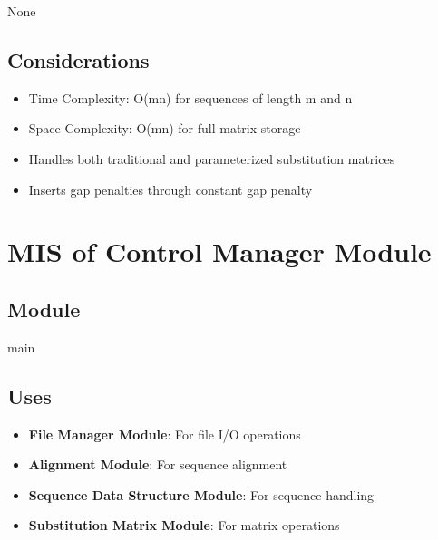 \documentclass[12pt, titlepage]{article}
\begin{document}
None

\subsection{Considerations}

\begin{itemize}
    \item Time Complexity: O(mn) for sequences of length m and n
    \item Space Complexity: O(mn) for full matrix storage
    \item Handles both traditional and parameterized substitution matrices
    \item Inserts gap penalties through constant gap penalty
\end{itemize}

\newpage

\section{MIS of Control Manager Module} \label{mCM}

\subsection{Module}

main

\subsection{Uses}

\begin{itemize}
    \item \textbf{File Manager Module}: For file I/O operations
    \item \textbf{Alignment Module}: For sequence alignment
    \item \textbf{Sequence Data Structure Module}: For sequence handling
    \item \textbf{Substitution Matrix Module}: For matrix operations
\end{itemize}
\end{document}
